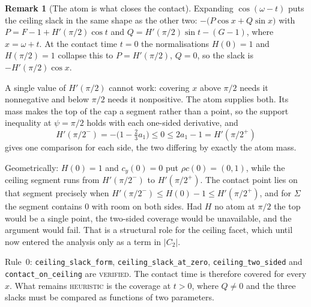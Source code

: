 \documentclass[11pt]{article}
\theoremstyle{definition}
\newtheorem{remark}[theorem]{Remark}
\newcommand{\Sig}{\Sigma}
\begin{document}
\begin{remark}[The atom is what closes the contact]\label{rem:v12}
Expanding $\cos(\omega-t)$ puts the ceiling slack in the same shape as the other two:
$-\bigl(P\cos x+Q\sin x\bigr)$ with $P=F-1+H'(\pi/2)\cos t$ and
$Q=H'(\pi/2)\sin t-(G-1)$, where $x=\omega+t$. At the contact time $t=0$ the normalisations
$H(0)=1$ and $H(\pi/2)=1$ collapse this to $P=H'(\pi/2)$, $Q=0$, so the slack is
$-H'(\pi/2)\cos x$.

A single value of $H'(\pi/2)$ cannot work: covering $x$ above $\pi/2$ needs it nonnegative
and below $\pi/2$ needs it nonpositive. The atom supplies both. Its mass makes the top of the
cap a segment rather than a point, so the support inequality at $\psi=\pi/2$ holds with each
one-sided derivative, and
\[
  H'(\pi/2^-)=-\bigl(1-\tfrac23a_1\bigr)\le0\le 2a_1-1=H'(\pi/2^+)
\]
gives one comparison for each side, the two differing by exactly the atom mass.

Geometrically: $H(0)=1$ and $c_y(0)=0$ put $\rho c(0)=(0,1)$, while the ceiling segment runs
from $H'(\pi/2^-)$ to $H'(\pi/2^+)$. The contact point lies on that segment precisely when
$H'(\pi/2^-)\le H(0)-1\le H'(\pi/2^+)$, and for $\Sig$ the segment contains $0$ with room on
both sides. Had $H$ no atom at $\pi/2$ the top would be a single point, the two-sided
coverage would be unavailable, and the argument would fail. That is a structural role for the
ceiling facet, which until now entered the analysis only as a term in $|C_2|$.

Rule~0: \verb|ceiling_slack_form|, \verb|ceiling_slack_at_zero|, \verb|ceiling_two_sided| and
\verb|contact_on_ceiling| are \textsc{verified}. The contact time is therefore covered for
every $x$. What remains \textsc{heuristic} is the coverage at $t>0$, where $Q\ne0$ and the
three slacks must be compared as functions of two parameters.
\end{remark}
\end{document}
